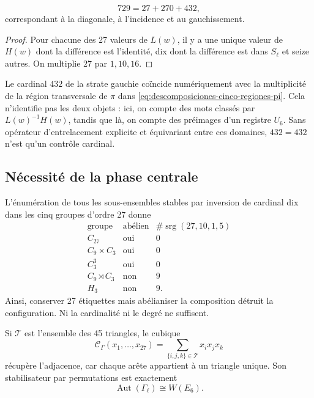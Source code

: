\begin{theorem}
\label{p12-83-c20-s6:thm:particion-hensel-schlafli-nueva}
\begin{equation}
 729=27+270+432,
 \label{p12-83-c20-s6:eq:particion-729-e6-nueva}
\end{equation}
correspondant à la diagonale, à l’incidence et au gauchissement.
\end{theorem}

\begin{proof}
Pour chacune des 27 valeurs de \(L(w)\), il y a une unique valeur de
\(H(w)\) dont la différence est l’identité, dix dont la différence est dans \(S_\ell\) et
seize autres. On multiplie \(27\) par \(1,10,16\).
\end{proof}

Le cardinal \(432\) de la strate gauchie coïncide numériquement avec la
multiplicité de la région transversale de \(\pi\) dans
\cref{eq:descomposiciones-cinco-regiones-pi}. Cela n’identifie pas les deux objets : ici,
on compte des mots classés par \(L(w)^{-1}H(w)\), tandis que là,
on compte des préimages d’un registre \(U_6\). Sans opérateur d’entrelacement explicite et
équivariant entre ces domaines, \(432=432\) n’est qu’un contrôle cardinal.

\subsection{Nécessité de la phase centrale}

L’énumération de tous les sous-ensembles stables par inversion de cardinal dix
dans les cinq groupes d’ordre 27 donne
\[
\begin{array}{c|c|c}
\text{groupe}&\text{abélien}&
\#\operatorname{srg}(27,10,1,5)\\ \hline
C_{27}&\text{oui}&0\\
C_9\times C_3&\text{oui}&0\\
C_3^3&\text{oui}&0\\
C_9\rtimes C_3&\text{non}&9\\
H_3&\text{non}&9.
\end{array}
\]
Ainsi, conserver 27 étiquettes mais abélianiser la composition détruit la configuration. Ni la cardinalité ni le degré ne suffisent.

Si \(\mathcal T\) est l’ensemble des 45 triangles, le cubique
\[
 \mathcal C_\Gamma(x_1,\ldots,x_{27})
 =\sum_{\{i,j,k\}\in\mathcal T}x_ix_jx_k
\]
récupère l'adjacence, car chaque arête appartient à un triangle unique. Son stabilisateur par permutations est exactement
\[
 \operatorname{Aut}(\Gamma_\ell)\cong W(E_6).
\]

